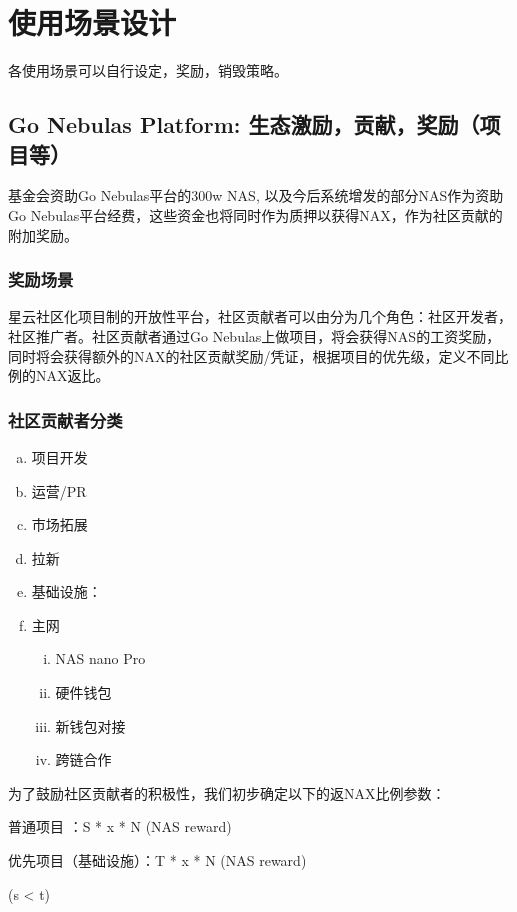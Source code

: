 \section{使用场景设计}

各使用场景可以自行设定，奖励，销毁策略。

\subsection{Go Nebulas Platform: 生态激励，贡献，奖励（项目等）}

基金会资助Go Nebulas平台的300w NAS, 以及今后系统增发的部分NAS作为资助Go Nebulas平台经费，这些资金也将同时作为质押以获得NAX，作为社区贡献的附加奖励。

\subsubsection{奖励场景}

星云社区化项目制的开放性平台，社区贡献者可以由分为几个角色：社区开发者，社区推广者。社区贡献者通过Go Nebulas上做项目，将会获得NAS的工资奖励， 同时将会获得额外的NAX的社区贡献奖励/凭证，根据项目的优先级，定义不同比例的NAX返比。

\subsubsection{社区贡献者分类}

\begin{enumerate}[a.]
  \item 项目开发
  \item 运营/PR
  \item 市场拓展
  \item 拉新
  \item 基础设施：
  \item 主网
\begin{enumerate}[i.]
  \item NAS nano Pro
  \item 硬件钱包
  \item 新钱包对接
  \item 跨链合作
\end{enumerate}
\end{enumerate}

为了鼓励社区贡献者的积极性，我们初步确定以下的返NAX比例参数：

普通项目 ：S * x * N (NAS reward)

优先项目（基础设施）：T * x * N (NAS reward)

(s < t)

